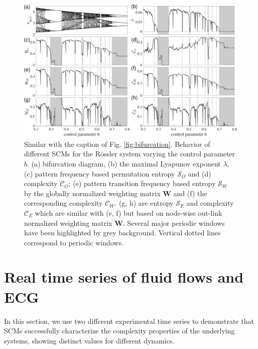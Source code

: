 \documentclass[12pt,aip,cha,reprint,nofootinbib]{revtex4-1}
\begin{document}
\begin{figure}
	\centering 
	\includegraphics[width=2\columnwidth]{rosslerEntropy.pdf}
\caption{\small{Similar with the caption of Fig. \ref{fig:bifurcation}. Behavior of different SCMs for the R\"ossler system varying the control parameter $b$. (a) bifurcation diagram, (b) the maximal Lyapunov exponent $\lambda$, (c) pattern frequency based permutation entropy $\mathcal{S}_O$ and (d) complexity $\mathcal{C}_O$; (e) pattern transition frequency based entropy $\mathcal{S}_W$ by the globally normalized weighting matrix $\mathbf{W}$ and (f) the corresponding complexity $\mathcal{C}_W$. (g, h) are entropy $\mathcal{S}_E$ and complexity $\mathcal{C}_E$ which are similar with (e, f) but based on node-wise out-link normalized weighting matrix $\mathbf{W}$. Several major periodic windows have been highlighted by grey background. Vertical dotted lines correspond to periodic windows. } \label{fig:bifurRossler}}
\end{figure}

\section{Real time series of fluid flows and ECG} \label{sec:time}
In this section, we use two different experimental time series to demonstrate that SCMs successfully characterize the complexity properties of the underlying systems, showing distinct values for different dynamics. 
\end{document}
